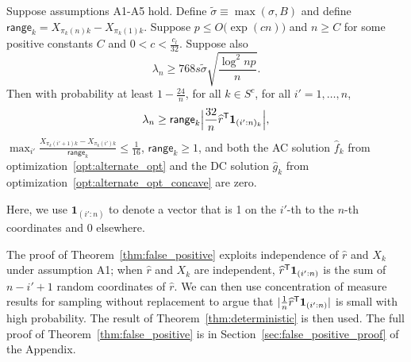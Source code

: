 \begin{theorem}
\label{thm:false_positive}
Suppose assumptions A1-A5 hold. Define $\tilde{\sigma} \equiv \max(\sigma, B)$ and define $\mathsf{range}_k = X_{\pi_k(n)k} - X_{\pi_k(1)k}$. Suppose $p \leq O\big( \exp(c n) \big)$ and $n \geq C$ for some positive constants $C$ and $0 < c < \frac{c_l}{32}$.  Suppose also
\begin{equation}
\lambda_n \geq 768 s \tilde{\sigma}  \sqrt{ \frac{\log^2 np}{n}}.
\end{equation}  
Then with probability at least $ 1 - \frac{24}{n}$, for all $k \in
S^c$, for all $i'=1,\ldots,n$,
\begin{equation}
\lambda_n \geq \mathsf{range}_k \Big| \frac{32}{n}\widehat{r}^{\mathsf{T}} \mbox{\boldmath $1$}_{(i':n)_k} \Big| ,
\end{equation}
$\max_{i'} \frac{X_{\pi_k(i'+1)k} - X_{\pi_k(i')k}}{\mathsf{range}_k} \leq \frac{1}{16}$, $\mathsf{range}_k \geq 1$, and both the AC solution $\hat{f}_k$ from optimization~\eqref{opt:alternate_opt} and the DC solution $\hat{g}_k$ from optimization~\eqref{opt:alternate_opt_concave} are zero. 
\end{theorem}
Here, we use $\mathbf{1}_{(i':n)}$ to denote a vector that is 1 on the $i'$-th to the $n$-th coordinates and 0 elsewhere.

The proof of Theorem~\ref{thm:false_positive} exploits independence of
$\hat{r}$ and $X_k$ under assumption A1; when $\hat{r}$ and $X_k$ are independent,
$\widehat{r}^{\mathsf{T}} \mbox{\boldmath $1$}_{(i':n)}$ is the sum of $n - i' +1$ random
coordinates of $\hat{r}$.  We can then use concentration of
measure results for sampling without replacement to argue that $|
\frac{1}{n} \widehat{r}^{\mathsf{T}}\mbox{\boldmath $1$}_{(i':n)}|$ is small with high
probability. The result of Theorem~\ref{thm:deterministic} is then
used. The full proof of Theorem~\ref{thm:false_positive} is in
Section~\ref{sec:false_positive_proof} of the Appendix.

